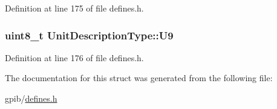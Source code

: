 Definition at line 175 of file defines.\+h.

\subsubsection[{\texorpdfstring{U9}{U9}}]{\setlength{\rightskip}{0pt plus 5cm}uint8\+\_\+t Unit\+Description\+Type\+::\+U9}\hypertarget{structUnitDescriptionType_a23817cabba1909bcf5a0732ed5da1351}{}\label{structUnitDescriptionType_a23817cabba1909bcf5a0732ed5da1351}


Definition at line 176 of file defines.\+h.



The documentation for this struct was generated from the following file\+:\begin{DoxyCompactItemize}
\item 
gpib/\hyperlink{defines_8h}{defines.\+h}\end{DoxyCompactItemize}
